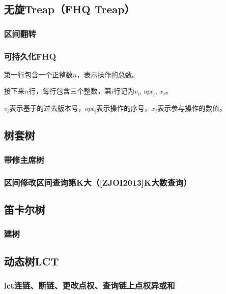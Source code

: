 \documentclass[landscape,twoside,a4paper]{article}
\begin{document}
\subsection{无旋Treap（FHQ Treap）}
\subsubsection{区间翻转}


\subsubsection{可持久化FHQ}
第一行包含一个正整数$n$，表示操作的总数。\par
接下来$n$行，每行包含三个整数，第$i$行记为${v}_{i}$, ${opt}_i$, $x_i$。\par
$v_i$表示基于的过去版本号，${opt}_i$表示操作的序号，$x_i$表示参与操作的数值。



\subsection{树套树}

\subsubsection{带修主席树}


\subsubsection{区间修改区间查询第K大（[ZJOI2013]K大数查询）}


\subsection{笛卡尔树}
\subsubsection{建树}



\subsection{动态树LCT}

\subsubsection{lct连链、断链、更改点权、查询链上点权异或和}

\end{document}
